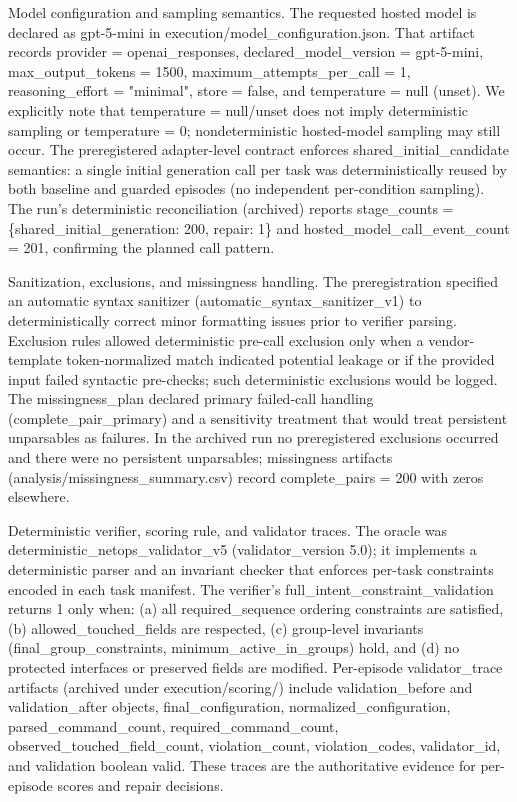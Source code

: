 \documentclass[conference]{IEEEtran}
\begin{document}
Model configuration and sampling semantics. The requested hosted model is declared as gpt-5-mini in execution/model\_configuration.json. That artifact records provider = openai\_responses, declared\_model\_version = gpt-5-mini, max\_output\_tokens = 1500, maximum\_attempts\_per\_call = 1, reasoning\_effort = "minimal", store = false, and temperature = null (unset). We explicitly note that temperature = null/unset does not imply deterministic sampling or temperature = 0; nondeterministic hosted-model sampling may still occur. The preregistered adapter-level contract enforces shared\_initial\_candidate semantics: a single initial generation call per task was deterministically reused by both baseline and guarded episodes (no independent per-condition sampling). The run's deterministic reconciliation (archived) reports stage\_counts = \{shared\_initial\_generation: 200, repair: 1\} and hosted\_model\_call\_event\_count = 201, confirming the planned call pattern.

Sanitization, exclusions, and missingness handling. The preregistration specified an automatic syntax sanitizer (automatic\_syntax\_sanitizer\_v1) to deterministically correct minor formatting issues prior to verifier parsing. Exclusion rules allowed deterministic pre-call exclusion only when a vendor-template token-normalized match indicated potential leakage or if the provided input failed syntactic pre-checks; such deterministic exclusions would be logged. The missingness\_plan declared primary failed-call handling (complete\_pair\_primary) and a sensitivity treatment that would treat persistent unparsables as failures. In the archived run no preregistered exclusions occurred and there were no persistent unparsables; missingness artifacts (analysis/missingness\_summary.csv) record complete\_pairs = 200 with zeros elsewhere.

Deterministic verifier, scoring rule, and validator traces. The oracle was deterministic\_netops\_validator\_v5 (validator\_version 5.0); it implements a deterministic parser and an invariant checker that enforces per-task constraints encoded in each task manifest. The verifier's full\_intent\_constraint\_validation returns 1 only when: (a) all required\_sequence ordering constraints are satisfied, (b) allowed\_touched\_fields are respected, (c) group-level invariants (final\_group\_constraints, minimum\_active\_in\_groups) hold, and (d) no protected interfaces or preserved fields are modified. Per-episode validator\_trace artifacts (archived under execution/scoring/) include validation\_before and validation\_after objects, final\_configuration, normalized\_configuration, parsed\_command\_count, required\_command\_count, observed\_touched\_field\_count, violation\_count, violation\_codes, validator\_id, and validation boolean valid. These traces are the authoritative evidence for per-episode scores and repair decisions.
\end{document}
